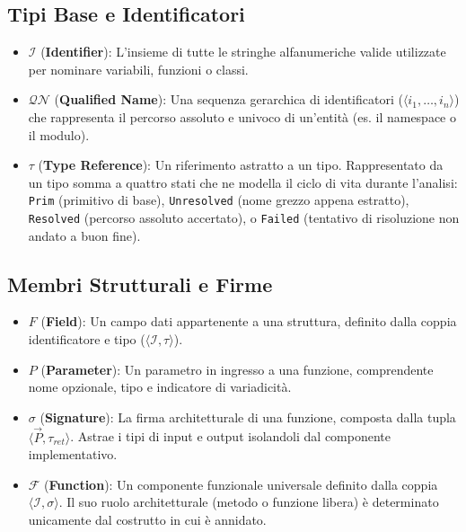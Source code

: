 \subsection{Tipi Base e Identificatori}
\begin{itemize}
  \item $\mathcal{I}$ (\textbf{Identifier}): L'insieme di tutte le
    stringhe alfanumeriche valide utilizzate per nominare variabili,
    funzioni o classi.
  \item $\mathcal{QN}$ (\textbf{Qualified Name}): Una sequenza
    gerarchica di identificatori ($\langle i_1, \dots, i_n \rangle$)
    che rappresenta il percorso assoluto e univoco di un'entità (es.
    il namespace o il modulo).
  \item $\tau$ (\textbf{Type Reference}): Un riferimento astratto a
    un tipo. Rappresentato da un tipo somma a quattro stati che ne
    modella il ciclo di vita durante l'analisi: \texttt{Prim}
    (primitivo di base), \texttt{Unresolved} (nome grezzo appena
    estratto), \texttt{Resolved} (percorso assoluto accertato), o
    \texttt{Failed} (tentativo di risoluzione non andato a buon fine).
\end{itemize}

\subsection{Membri Strutturali e Firme}
\begin{itemize}
  \item $F$ (\textbf{Field}): Un campo dati appartenente a una
    struttura, definito dalla coppia identificatore e tipo ($\langle
    \mathcal{I}, \tau \rangle$).
  \item $P$ (\textbf{Parameter}): Un parametro in ingresso a una
    funzione, comprendente nome opzionale, tipo e indicatore di variadicità.
  \item $\sigma$ (\textbf{Signature}): La firma architetturale di una
    funzione, composta dalla tupla $\langle \vec{P}, \tau_{ret}
    \rangle$. Astrae i tipi di input e output isolandoli dal
    componente implementativo.
  \item $\mathcal{F}$ (\textbf{Function}): Un componente funzionale
    universale definito dalla coppia $\langle \mathcal{I}, \sigma
    \rangle$. Il suo ruolo architetturale (metodo o funzione libera)
    è determinato unicamente dal costrutto in cui è annidato.
\end{itemize}

